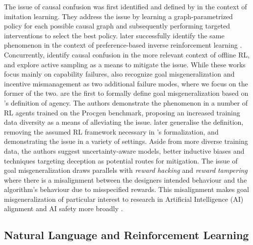\documentclass[../thesis-proposal/main.tex]{subfiles}
\begin{document}
The issue of causal confusion was first identified and defined by \citet{de_haan_causal_2019} in the
context of imitation learning. They address the issue by learning a graph-parametrized policy for
each possible causal graph and subsequently performing targeted interventions to select the best
policy.  later successfully identify the same phenomenon in the context of
preference-based \citep{christiano_deep_2017} inverse reinforcement learning
\citep{ng_algorithms_2000}. Concurrently, \citet{gupta_can_2022} identify causal confusion in the
more relevant context of offline RL, and explore active sampling as a means to mitigate the issue.
While these works focus mainly on capability failures, \citet{kirk_causal_2022} also recognize goal
misgeneralization and incentive mismanagement \citep{farquhar_path-specific_2022} as two additional
failure modes, where we focus on the former of the two.  are the first to
formally define goal misgeneralization based on \citet{orseau_agents_2018}'s definition of agency.
The authors demonstrate the phenomenon in a number of RL agents trained on the Procgen
\citep{cobbe_leveraging_2020} benchmark, proposing an increased training data diversity as a means
of alleviating the issue.  later generalise the definition, removing the
assumed RL framework necessary in \citet{langosco_goal_2022}'s formalization, and demonstrating the
issue in a variety of settings. Aside from more diverse training data, the authors suggest
uncertainty-aware models, better inductive biases and techniques targeting deception as potential
routes for mitigation. The issue of goal misgeneralization draws parallels with \textit{reward
hacking} \citep{pan_effects_2022, skalse_defining_2022} and \textit{reward
tampering} \citep{everitt_reward_2021} where there is a misalignment between the designers intended
behaviour and the algorithm's behaviour due to misspecified rewards. This misalignment makes goal
misgeneralization of particular interest to research in
Artificial Intelligence (AI) alignment \citep{ngo_alignment_2022} and AI safety more broadly
\citep{hendrycks_unsolved_2022, houben_inspect_2022}.


\subsection{Natural Language and Reinforcement Learning} 


\ifSubfilesClassLoaded{%
  
}{}
\end{document}
